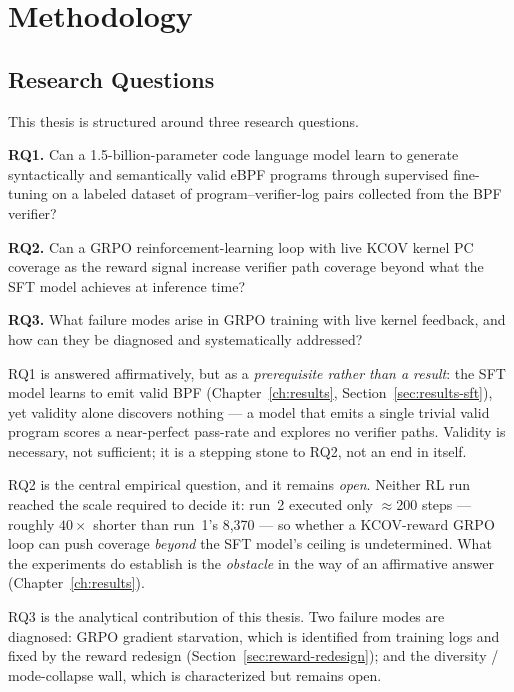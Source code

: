 \chapter{Methodology}
\label{ch:methodology}

\section{Research Questions}
\label{sec:rq}

This thesis is structured around three research questions.

\textbf{RQ1.} Can a 1.5-billion-parameter code language model learn to generate
syntactically and semantically valid eBPF programs through supervised fine-tuning
on a labeled dataset of program--verifier-log pairs collected from the BPF
verifier?

\textbf{RQ2.} Can a GRPO reinforcement-learning loop with live KCOV kernel PC
coverage as the reward signal increase verifier path coverage beyond what the SFT
model achieves at inference time?

\textbf{RQ3.} What failure modes arise in GRPO training with live kernel feedback,
and how can they be diagnosed and systematically addressed?

RQ1 is answered affirmatively, but as a \emph{prerequisite rather than a result}:
the SFT model learns to emit valid BPF (Chapter~\ref{ch:results},
Section~\ref{sec:results-sft}), yet validity alone discovers nothing --- a model
that emits a single trivial valid program scores a near-perfect pass-rate and
explores no verifier paths. Validity is necessary, not sufficient; it is a
stepping stone to RQ2, not an end in itself.

RQ2 is the central empirical question, and it remains \emph{open}. Neither RL run
reached the scale required to decide it: run~2 executed only $\approx$200 steps
--- roughly $40\times$ shorter than run~1's 8{,}370 --- so whether a KCOV-reward
GRPO loop can push coverage \emph{beyond} the SFT model's ceiling is undetermined.
What the experiments do establish is the \emph{obstacle} in the way of an
affirmative answer (Chapter~\ref{ch:results}).

RQ3 is the analytical contribution of this thesis. Two failure modes are
diagnosed: GRPO gradient starvation, which is identified from training logs and
fixed by the reward redesign (Section~\ref{sec:reward-redesign}); and the
diversity / mode-collapse wall, which is characterized but remains open.

